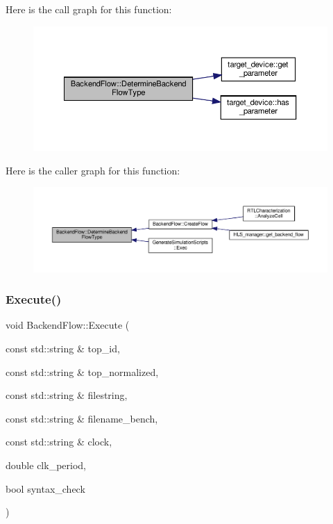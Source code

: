Here is the call graph for this function\+:
\nopagebreak
\begin{figure}[H]
\begin{center}
\leavevmode
\includegraphics[width=350pt]{da/d75/classBackendFlow_ac9035b8c54cffb28b61036aed44e5381_cgraph}
\end{center}
\end{figure}
Here is the caller graph for this function\+:
\nopagebreak
\begin{figure}[H]
\begin{center}
\leavevmode
\includegraphics[width=350pt]{da/d75/classBackendFlow_ac9035b8c54cffb28b61036aed44e5381_icgraph}
\end{center}
\end{figure}
\mbox{\label{classBackendFlow_a96bbfb3f9fd7cf6dbd162f692ac81f9f}} 
\subsubsection{\texorpdfstring{Execute()}{Execute()}}
{\footnotesize\ttfamily void Backend\+Flow\+::\+Execute (\begin{DoxyParamCaption}\item[{const std\+::string \&}]{top\+\_\+id,  }\item[{const std\+::string \&}]{top\+\_\+normalized,  }\item[{const std\+::string \&}]{filestring,  }\item[{const std\+::string \&}]{filename\+\_\+bench,  }\item[{const std\+::string \&}]{clock,  }\item[{double}]{clk\+\_\+period,  }\item[{bool}]{syntax\+\_\+check }\end{DoxyParamCaption})}



